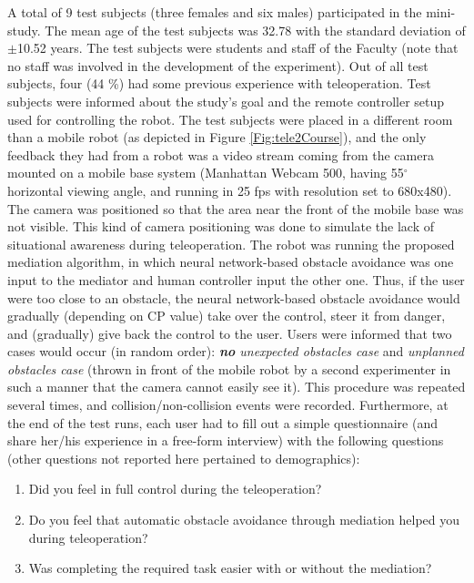 A total of 9 test subjects (three females and six males) participated in the mini-study. The mean age of the test subjects was 32.78 with the standard deviation of $\pm$10.52 years. The test subjects were students and staff of the Faculty (note that no staff was involved in the development of the experiment). Out of all test subjects, four (44 \%) had some previous experience with teleoperation.
Test subjects were informed about the study's goal and the remote controller setup used for controlling the robot. The test subjects were placed in a different room than a mobile robot (as depicted in Figure \ref{Fig:tele2Course}), and the only feedback they had from a robot was a video stream coming from the camera mounted on a mobile base system (Manhattan Webcam 500, having 55$^{\circ}$ horizontal viewing angle, and running in 25 fps with resolution set to 680x480). The camera was positioned so that the area near the front of the mobile base was not visible. This kind of camera positioning was done to simulate the lack of situational awareness during teleoperation. The robot was running the proposed mediation algorithm, in which neural network-based obstacle avoidance was one input to the mediator and human controller input the other one. Thus, if the user were too close to an obstacle, the neural network-based obstacle avoidance would gradually (depending on CP value) take over the control, steer it from danger, and (gradually) give back the control to the user. Users were informed that two cases would occur (in random order): \emph{\textbf{no} unexpected obstacles case} and \emph{unplanned obstacles case} (thrown in front of the mobile robot by a second experimenter in such a manner that the camera cannot easily see it). This procedure was repeated several times, and collision/non-collision events were recorded. Furthermore, at the end of the test runs, each user had to fill out a simple questionnaire (and share her/his experience in a free-form interview) with the following questions (other questions not reported here pertained to demographics):

\begin{enumerate}
\item Did you feel in full control during the teleoperation?
\item Do you feel that automatic obstacle avoidance through mediation helped you during teleoperation?
\item Was completing the required task easier with or without the mediation?
\end{enumerate}

